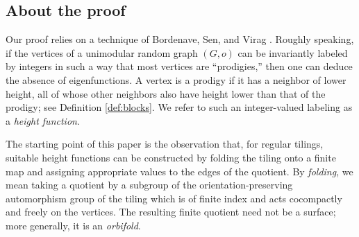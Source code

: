 \documentclass[11pt]{article}
\theoremstyle{remark}
\newcommand{\Z}{\mathbb Z}
\begin{document}

\subsection{About the proof}
Our proof relies on a technique of Bordenave, Sen, and Virag \cite{BSV17}. Roughly speaking, if the vertices of a unimodular random graph $(G,o)$ can be invariantly labeled by integers in such a way that most vertices are ``prodigies,'' then one can deduce the absence of eigenfunctions. A vertex is a prodigy if it has a neighbor of lower height, all of whose other neighbors also have height lower than that of the prodigy; see Definition \ref{def:blocks}. We refer to such an integer-valued labeling as a \emph{height function}.



The starting point of this paper is the observation that, for regular tilings, suitable height functions can be constructed by folding the tiling onto a finite map and assigning appropriate values to the edges of the quotient. By \emph{folding}, we mean taking a quotient by a subgroup of the orientation-preserving automorphism group of the tiling which is of finite index and acts cocompactly and freely on the vertices. The resulting finite quotient need not be a surface; more generally, it is an \emph{orbifold}.
\end{document}
